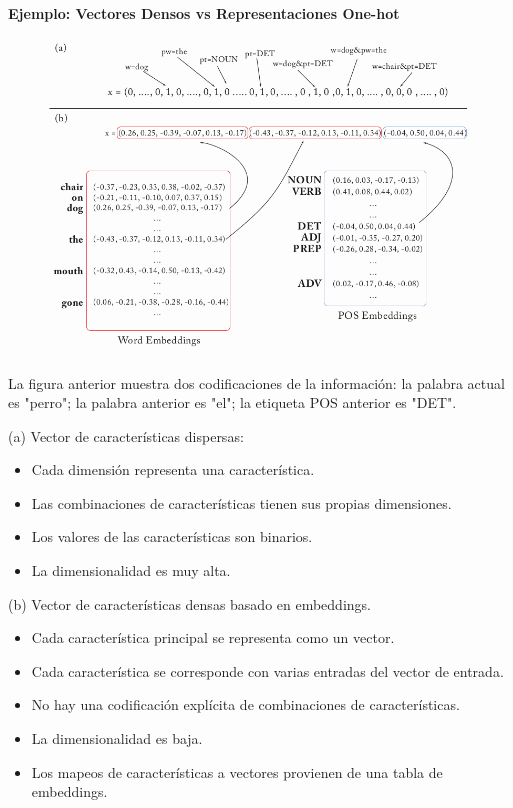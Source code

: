 \paragraph{Ejemplo: Vectores Densos vs Representaciones One-hot}

\begin{figure}[htb]
	\centering
	 \includegraphics[scale=0.35]{pics/denseonehot.png}
\end{figure}

La figura anterior muestra dos codificaciones de la información: la palabra actual es "perro"; la palabra anterior es "el"; la etiqueta POS anterior es "DET".

(a) Vector de características dispersas:
\begin{itemize}
 \item Cada dimensión representa una característica.
\item Las combinaciones de características tienen sus propias dimensiones.
\item Los valores de las características son binarios.
\item La dimensionalidad es muy alta.
\end{itemize}


(b) Vector de características densas basado en embeddings.

\begin{itemize}
\item Cada característica principal se representa como un vector.
\item  Cada característica se corresponde con varias entradas del vector de entrada.
\item No hay una codificación explícita de combinaciones de características.
\item La dimensionalidad es baja.
\item Los mapeos de características a vectores provienen de una tabla de embeddings.
\end{itemize}



